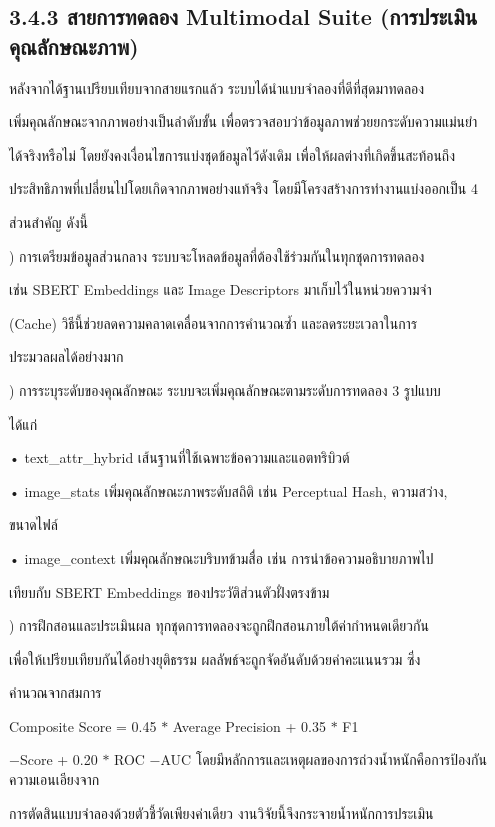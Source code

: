 \documentclass[12pt,a4paper]{report}
\begin{document}
\subsection*{3.4.3 สายการทดลอง Multimodal Suite (การประเมินคุณลักษณะภาพ)}
หลังจากได้ฐานเปรียบเทียบจากสายแรกแล้ว ระบบได้นำแบบจำลองที่ดีที่สุดมาทดลอง\par
เพิ่มคุณลักษณะจากภาพอย่างเป็นลำดับขั้น เพื่อตรวจสอบว่าข้อมูลภาพช่วยยกระดับความแม่นยำ\par
ได้จริงหรือไม่ โดยยังคงเงื่อนไขการแบ่งชุดข้อมูลไว้ดังเดิม เพื่อให้ผลต่างที่เกิดขึ้นสะท้อนถึง\par
\clearpage
ประสิทธิภาพที่เปลี่ยนไปโดยเกิดจากภาพอย่างแท้จริง โดยมีโครงสร้างการทำงานแบ่งออกเป็น 4\par
ส่วนสำคัญ ดังนี้\par
{}) การเตรียมข้อมูลส่วนกลาง ระบบจะโหลดข้อมูลที่ต้องใช้ร่วมกันในทุกชุดการทดลอง\par
เช่น SBERT Embeddings และ Image Descriptors มาเก็บไว้ในหน่วยความจำ\par
(Cache) วิธีนี้ช่วยลดความคลาดเคลื่อนจากการคำนวณซ้ำ และลดระยะเวลาในการ\par
ประมวลผลได้อย่างมาก\par
{}) การระบุระดับของคุณลักษณะ ระบบจะเพิ่มคุณลักษณะตามระดับการทดลอง 3 รูปแบบ\par
ได้แก่\par
\noindent • text\_attr\_hybrid เส้นฐานที่ใช้เฉพาะข้อความและแอตทริบิวต์\par
\noindent • image\_stats เพิ่มคุณลักษณะภาพระดับสถิติ เช่น Perceptual Hash, ความสว่าง,\par
ขนาดไฟล์\par
\noindent • image\_context เพิ่มคุณลักษณะบริบทข้ามสื่อ เช่น การนำข้อความอธิบายภาพไป\par
เทียบกับ SBERT Embeddings ของประวัติส่วนตัวฝั่งตรงข้าม\par
{}) การฝึกสอนและประเมินผล ทุกชุดการทดลองจะถูกฝึกสอนภายใต้ค่ากำหนดเดียวกัน\par
เพื่อให้เปรียบเทียบกันได้อย่างยุติธรรม ผลลัพธ์จะถูกจัดอันดับด้วยค่าคะแนนรวม ซึ่ง\par
คำนวณจากสมการ\par
Composite Score = 0.45 \ensuremath{\ast} Average Precision + 0.35 \ensuremath{\ast} F1\par
−Score + 0.20 \ensuremath{\ast} ROC −AUC โดยมีหลักการและเหตุผลของการถ่วงน้ำหนักคือการป้องกันความเอนเอียงจาก\par
การตัดสินแบบจำลองด้วยตัวชี้วัดเพียงค่าเดียว งานวิจัยนี้จึงกระจายน้ำหนักการประเมิน\par
\end{document}
